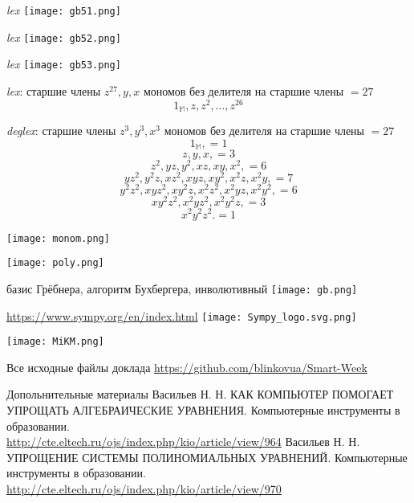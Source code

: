 \documentclass[10pt,utf8,presentation,notheorems,xcolor=dvipsnames,compress]{beamer}
\begin{document}
\begin{frame}{\emph{lex}}
\texttt{[image: gb51.png]}
\end{frame}

\begin{frame}{\emph{lex}}
\texttt{[image: gb52.png]}
\end{frame}

\begin{frame}{\emph{lex}}
\texttt{[image: gb53.png]}
\end{frame}


\begin{frame}
\begin{block}{\emph{lex}: старшие члены $z^{27}, y, x$}
мономов без делителя на старшие члены $=27$
$$1_{\mathbb{M}}, z, z^2,  \ldots, z^{26}$$
\end{block}

\begin{block}{\emph{deglex}: старшие члены $z^3, y^3, x^3$}
мономов без делителя на старшие члены $=27$
$$1_{\mathbb{M}},=1$$ 
$$z, y, x,=3$$ 
$$z^2, yz, y^2, xz, xy, x^2,=6$$
$$yz^2, y^2z, xz^2, xyz, xy^2, x^2z, x^2y,=7$$
$$y^2z^2, xyz^2, xy^2z, x^2z^2, x^2yz, x^2y^2,=6$$
$$xy^2z^2, x^2yz^2, x^2y^2z,=3$$
$$x^2y^2z^2.=1$$
\end{block}
\end{frame}

\begin{frame}
\texttt{[image: monom.png]}
\end{frame}

\begin{frame}
\texttt{[image: poly.png]}
\end{frame}

\begin{frame}{базис Грёбнера, алгоритм Бухбергера, инволютивный}
\texttt{[image: gb.png]}
\end{frame}

\begin{frame}{\url{https://www.sympy.org/en/index.html}}
\texttt{[image: Sympy\_logo.svg.png]}
\end{frame}


\begin{frame}
\texttt{[image: MiKM.png]}
\end{frame}

\begin{frame}
Все исходные файлы доклада \url{https://github.com/blinkovua/Smart-Week}

\begin{block}{Допольнительные материалы}
Васильев Н. Н. КАК КОМПЬЮТЕР ПОМОГАЕТ УПРОЩАТЬ АЛГЕБРАИЧЕСКИЕ УРАВНЕНИЯ. Компьютерные инструменты в образовании. \\
\url{http://cte.eltech.ru/ojs/index.php/kio/article/view/964}
\vskip 5mm
Васильев Н. Н. УПРОЩЕНИЕ СИСТЕМЫ ПОЛИНОМИАЛЬНЫХ УРАВНЕНИЙ. Компьютерные инструменты в образовании.\\ 
\url{http://cte.eltech.ru/ojs/index.php/kio/article/view/970}
\end{block}
\end{frame}
\end{document}
